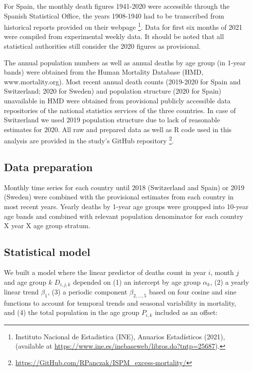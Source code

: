 \documentclass{article}
\begin{document}
	For Spain, the monthly death figures 1941-2020 were accessible through the Spanish Statistical Office, the years 1908-1940 had to be transcribed from historical reports provided on their webpage \footnote{Instituto Nacional de Estadistica (INE), Anuarios Estadísticos (2021), (available at \url{https://www.ine.es/inebaseweb/libros.do?tntp=25687}).}. Data for first six months of 2021 were compiled from experimental weekly data. It should be noted that all statistical authorities still consider the 2020 figures as provisional. 
	
	The annual population numbers as well as annual deaths by age group (in 1-year bands) were obtained from the Human Mortality Database (HMD, www.mortality.org). Most recent annual death counts (2019-2020 for Spain and Switzerland; 2020 for Sweden) and population structure (2020 for Spain) unavailable in HMD were obtained from provisional publicly accessible data repositories of the national statistics services of the three countries. In case of Switzerland we used 2019 population structure due to lack of reasonable estimates for 2020. All raw and prepared data as well as R code used in this analysis are provided in the study's GitHub repository \footnote{\url{https://GitHub.com/RPanczak/ISPM_excess-mortality/}}.
	
	\subsection{Data preparation}
	
	Monthly time series for each country until 2018 (Switzerland and Spain) or 2019 (Sweden) were combined with the provisional estimates from each country in most recent years. Yearly deaths by 1-year age groups were groupped into 10-year age bands and combined with relevant population denominator for each country X year X age group stratum.  
	
	\subsection{Statistical model}
	
	We built a model where the linear predictor of deaths count in year $i$, month $j$ and age group $k$ $D_{i,j,k}$ depended on (1) an intercept by age group $\alpha_k$, (2) a yearly linear trend $\beta_1$, (3) a periodic component $\beta_{2,\ldots,5}$ based on four cosine and sine functions to account for temporal trends and seasonal variability in mortality, and (4) the total population in the age group $P_{i,k}$ included as an offset: 
	
\end{document}
